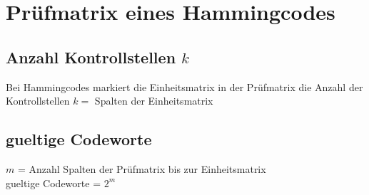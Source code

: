 \section{Prüfmatrix eines Hammingcodes}
\subsection{Anzahl Kontrollstellen $k$}
Bei Hammingcodes markiert die Einheitsmatrix in der Prüfmatrix die Anzahl der Kontrollstellen \colorbox{lightlightgrey}{$k = $ Spalten der Einheitsmatrix}
\subsection{gueltige Codeworte}
$m$ = Anzahl Spalten der Prüfmatrix bis zur Einheitsmatrix\\
\colorbox{lightlightgrey}{gueltige Codeworte = $2^m$}

